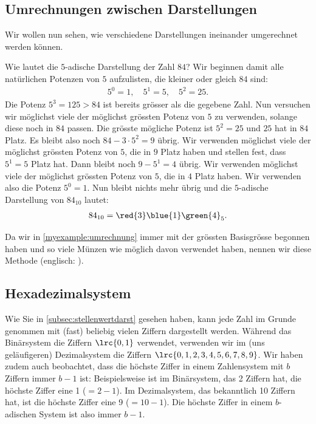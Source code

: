 \subsection{Umrechnungen zwischen Darstellungen}
Wir wollen nun sehen, wie verschiedene Darstellungen ineinander umgerechnet werden können.
\begin{myexample}\label{myexample:umrechnung}
Wie lautet die $5$-adische Darstellung der Zahl $84$? Wir beginnen damit alle natürlichen Potenzen von $5$
aufzulisten, die kleiner oder gleich $84$ sind:
\begin{align*}
	5^0 = 1, \quad 5^1 = 5, \quad 5^2 = 25.
\end{align*}
Die Potenz $5^3 = 125 > 84$ ist bereits grösser als die gegebene Zahl. Nun versuchen wir möglichst viele der möglichst
grössten Potenz von $5$ zu verwenden, solange diese noch in $84$ passen. Die grösste mögliche Potenz ist $5^2 = 25$ und
$25$ hat  in $84$ Platz. Es bleibt also noch $84-3\cdot 5^2 = 9$ übrig. Wir verwenden möglichst viele der
möglichst grössten Potenz von $5$, die in $9$ Platz haben und stellen fest, dass $5^1=5$  Platz hat. Dann
bleibt noch $9-5^1 = 4$ übrig. Wir verwenden möglichst viele der möglichst grössten Potenz von $5$, die in $4$ Platz
haben. Wir verwenden also  die Potenz $5^0 = 1$. Nun bleibt nichts mehr übrig und die $5$-adische
Darstellung von $84_{10}$ lautet:
\begin{align*}
	84_{10} = \red{3}\blue{1}\green{4}_5.
\end{align*}
\end{myexample}
Da wir in \cref{myexample:umrechnung} immer mit der grössten Basisgrösse begonnen haben und so viele Münzen wie möglich
davon verwendet haben, nennen wir diese Methode  (englisch: ).

\subsection{Hexadezimalsystem}
Wie Sie in \cref{subsec:stellenwertdarst} gesehen haben, kann jede Zahl im Grunde genommen mit (fast) beliebig vielen Ziffern dargestellt werden. Während das Binärsystem die Ziffern $\lrc{0,1}$ verwendet, verwenden wir im (uns geläufigeren) Dezimalsystem die Ziffern $\lrc{0,1,2,3,4,5,6,7,8,9}$. Wir haben zudem auch beobachtet, dass die höchste Ziffer in einem Zahlensystem mit $b$ Ziffern immer $b-1$ ist: Beispielsweise ist im Binärsystem, das 2 Ziffern hat, die höchste Ziffer eine 1 ($= 2-1$). Im Dezimalsystem, das bekanntlich 10 Ziffern hat, ist die höchste Ziffer eine 9 ($ = 10-1$). Die höchste Ziffer in einem $b$-adischen System ist also immer $b-1$.

